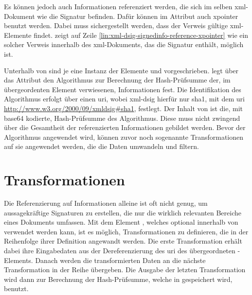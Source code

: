Es können jedoch auch Informationen referenziert werden, die sich im selben \gls{xml}-Dokument wie die Signatur befinden. Dafür können im Attribut
 auch \gls{xpointer} benutzt werden. Dabei muss sichergestellt werden, dass der Verweis gültige \gls{xml}-Elemente findet.
 zeigt auf Zeile \ref{lin:xml-dsig-signedinfo-reference-xpointer} wie ein solcher Verweis innerhalb des \gls{xml}-Dokuments,
das die Signatur enthält, möglich ist.

Unterhalb von  sind je eine Instanz der Elemente  und  vorgeschrieben.  legt
über das Attribut  den Algorithmus zur Berechnung der Hash-Prüfsumme der, im übergeordenten Element  verwiesenen,
Informationen fest. Die Identifikation des Algorithmus erfolgt über einen \gls{uri}, wobei \gls{xml-dsig} hierfür nur \gls{sha1}, mit dem \gls{uri}
\url{http://www.w3.org/2000/09/xmldsig#sha1}, festlegt. Der Inhalt von  ist die, mit \gls{base64} kodierte, Hash-Prüfsumme des
Algorithmus. Diese muss nicht zwingend über die Gesamtheit der referenzierten Informationen gebildet werden. Bevor der Algorithmus angewendet wird, können zuvor
noch sogenannte Transformationen auf sie angewendet werden, die die Daten umwandeln und filtern.



\section{Transformationen}
\label{sec:XML-DSig:Transformationen}
Die Referenzierung auf Informationen alleine ist oft nicht genug, um aussagekräftige Signaturen zu erstellen, die nur die wirklich relevanten Bereiche eines
Dokuments umfassen. Mit dem Element , welches optional innerhalb von  verwendet werden kann, ist es möglich,
Transformationen zu definieren, die in der Reihenfolge ihrer Definition angewandt werden. Die erste Transformation erhält dabei ihre Eingabedaten aus der
Dereferenzierung des \gls{uri} des übergeordneten -Elements. Danach werden die transformierten Daten an die nächste Transformation in der
Reihe übergeben. Die Ausgabe der letzten Transformation wird dann zur Berechnung der Hash-Prüfsumme, welche in  gespeichert wird, benutzt.

